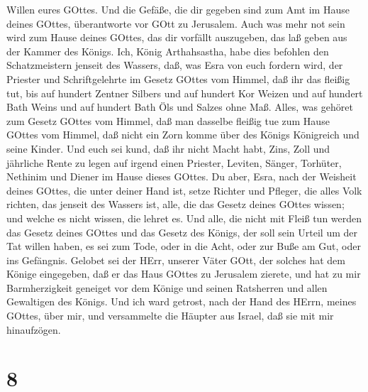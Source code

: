 Willen eures GOttes.  Und die Gefäße, die dir gegeben sind
zum Amt im Hause deines GOttes, überantworte vor GOtt zu Jerusalem.
 Auch was mehr not sein wird zum Hause deines GOttes, das
dir vorfällt auszugeben, das laß geben aus der Kammer des Königs.
 Ich, König Arthahsastha, habe dies befohlen den
Schatzmeistern jenseit des Wassers, daß, was Esra von euch fordern wird,
der Priester und Schriftgelehrte im Gesetz GOttes vom Himmel, daß ihr
das fleißig tut,  bis auf hundert Zentner Silbers und auf
hundert Kor Weizen und auf hundert Bath Weins und auf hundert Bath Öls
und Salzes ohne Maß.  Alles, was gehöret zum Gesetz GOttes
vom Himmel, daß man dasselbe fleißig tue zum Hause GOttes vom Himmel,
daß nicht ein Zorn komme über des Königs Königreich und seine Kinder.
 Und euch sei kund, daß ihr nicht Macht habt, Zins, Zoll
und jährliche Rente zu legen auf irgend einen Priester, Leviten, Sänger,
Torhüter, Nethinim und Diener im Hause dieses GOttes.  Du
aber, Esra, nach der Weisheit deines GOttes, die unter deiner Hand ist,
setze Richter und Pfleger, die alles Volk richten, das jenseit des
Wassers ist, alle, die das Gesetz deines GOttes wissen; und welche es
nicht wissen, die lehret es.  Und alle, die nicht mit Fleiß
tun werden das Gesetz deines GOttes und das Gesetz des Königs, der soll
sein Urteil um der Tat willen haben, es sei zum Tode, oder in die Acht,
oder zur Buße am Gut, oder ins Gefängnis.  Gelobet sei der
HErr, unserer Väter GOtt, der solches hat dem Könige eingegeben, daß er
das Haus GOttes zu Jerusalem zierete,  und hat zu mir
Barmherzigkeit geneiget vor dem Könige und seinen Ratsherren und allen
Gewaltigen des Königs. Und ich ward getrost, nach der Hand des HErrn,
meines GOttes, über mir, und versammelte die Häupter aus Israel, daß sie
mit mir hinaufzögen.

\hypertarget{section-7}{%
\section{8}\label{section-7}}

